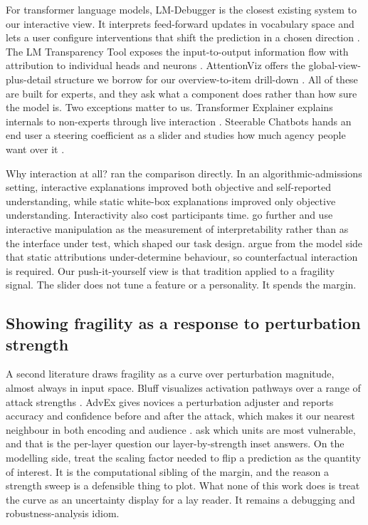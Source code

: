 \documentclass[sigconf]{acmart}
\begin{document}
For transformer language models, LM-Debugger is the closest existing system to our interactive view. It
interprets feed-forward updates in vocabulary space and lets a user configure interventions that shift the
prediction in a chosen direction \cite{gevaLMDebuggerInteractiveTool2022}. The LM Transparency Tool exposes the
input-to-output information flow with attribution to individual heads and neurons
\cite{tufanovLMTransparencyTool2024}. AttentionViz offers the global-view-plus-detail structure we borrow for
our overview-to-item drill-down \cite{yehAttentionVizGlobalView2023}. All of these are built for experts, and
they ask what a component does rather than how sure the model is. Two exceptions matter to us. Transformer
Explainer explains internals to non-experts through live interaction
\cite{choTransformerExplainerLearning2024}. Steerable Chatbots hands an end user a steering coefficient as a
slider and studies how much agency people want over it \cite{boSteerableChatbotsExploring2025}.

Why interaction at all? \citet{chengExplainingDecisionMakingAlgorithms2019} ran the comparison directly. In an
algorithmic-admissions setting, interactive explanations improved both objective and self-reported
understanding, while static white-box explanations improved only objective understanding. Interactivity also
cost participants time. \citet{rossEvaluatingInterpretabilityGenerative2021a} go further and use interactive
manipulation as the measurement of interpretability rather than as the interface under test, which shaped our
task design. \citet{kirchlerExplainabilityRequiresInteractivity2021} argue from the model side that static
attributions under-determine behaviour, so counterfactual interaction is required. Our push-it-yourself view is
that tradition applied to a fragility signal. The slider does not tune a feature or a personality. It spends
the margin.

\subsection{Showing fragility as a response to perturbation strength}

A second literature draws fragility as a curve over perturbation magnitude, almost always in input space.
Bluff visualizes activation pathways over a range of attack strengths
\cite{dasBluffInteractivelyDeciphering2020}. AdvEx gives novices a perturbation adjuster and reports accuracy
and confidence before and after the attack, which makes it our nearest neighbour in both encoding and audience
\cite{youPandaNotPanda2023}. \citet{liVisualAnalyticsNeuron2023} ask which units are most vulnerable, and that
is the per-layer question our layer-by-strength inset answers. On the modelling side,
\citet{stoehrActivationScalingSteering2024} treat the scaling factor needed to flip a prediction as the
quantity of interest. It is the computational sibling of the margin, and the reason a strength sweep is a
defensible thing to plot. What none of this work does is treat the curve as an uncertainty display for a lay
reader. It remains a debugging and robustness-analysis idiom.
\end{document}
